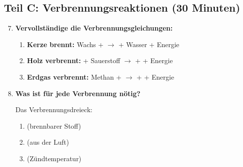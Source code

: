 \subsection*{Teil C: Verbrennungsreaktionen (30 Minuten)}

\begin{enumerate}[label=\arabic*.]
    \setcounter{enumi}{6}

    \item \textbf{Vervollständige die Verbrennungsgleichungen:}
    \vspace{0.5cm}

    \begin{enumerate}[label=\alph*)]
        \item \textbf{Kerze brennt:}
        \vspace{0.5cm}
        Wachs + \underline{\hspace{3cm}} $\rightarrow$ \underline{\hspace{3cm}} + Wasser + Energie

        \item \textbf{Holz verbrennt:}
        \vspace{0.5cm}
        \underline{\hspace{3cm}} + Sauerstoff $\rightarrow$ \underline{\hspace{3cm}} + \underline{\hspace{3cm}} + Energie

        \item \textbf{Erdgas verbrennt:}
        \vspace{0.5cm}
        Methan + \underline{\hspace{3cm}} $\rightarrow$ \underline{\hspace{3cm}} + \underline{\hspace{3cm}} + Energie
    \end{enumerate}

    \vspace{1cm}

    \item \textbf{Was ist für jede Verbrennung nötig?}
    \vspace{0.5cm}

    Das Verbrennungsdreieck:

    \begin{enumerate}[label=\arabic*.)]
        \item \underline{\hspace{4cm}} (brennbarer Stoff)
        \item \underline{\hspace{4cm}} (aus der Luft)
        \item \underline{\hspace{4cm}} (Zündtemperatur)
    \end{enumerate}


\end{enumerate}
